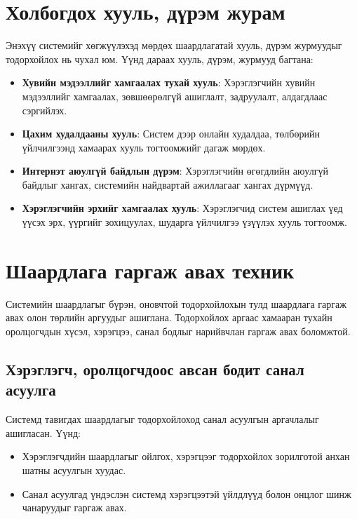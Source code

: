 
\section{Холбогдох хууль, дүрэм журам}
Энэхүү системийг хөгжүүлэхэд мөрдөх шаардлагатай хууль, дүрэм журмуудыг тодорхойлох нь чухал юм. Үүнд дараах хууль, дүрэм, журмууд багтана:
\begin{itemize}
    \item \textbf{Хувийн мэдээллийг хамгаалах тухай хууль}: Хэрэглэгчийн хувийн мэдээллийг хамгаалах, зөвшөөрөлгүй ашиглалт, задруулалт, алдагдлаас сэргийлэх.
    \item \textbf{Цахим худалдааны хууль}: Систем дээр онлайн худалдаа, төлбөрийн үйлчилгээнд хамаарах хууль тогтоомжийг дагаж мөрдөх.
    \item \textbf{Интернэт аюулгүй байдлын дүрэм}: Хэрэглэгчийн өгөгдлийн аюулгүй байдлыг хангах, системийн найдвартай ажиллагааг хангах дүрмүүд.
    \item \textbf{Хэрэглэгчийн эрхийг хамгаалах хууль}: Хэрэглэгчид систем ашиглах үед үүсэх эрх, үүргийг зохицуулах, шударга үйлчилгээ үзүүлэх хууль тогтоомж.
\end{itemize}

\section{Шаардлага гаргаж авах техник}
Системийн шаардлагыг бүрэн, оновчтой тодорхойлохын тулд шаардлага гаргаж авах олон төрлийн аргуудыг ашиглана. Тодорхойлох аргаас хамааран тухайн оролцогчдын хүсэл, хэрэгцээ, санал бодлыг нарийвчлан гаргаж авах боломжтой.

\subsection{Хэрэглэгч, оролцогчдоос авсан бодит санал асуулга}
Системд тавигдах шаардлагыг тодорхойлоход санал асуулгын аргачлалыг ашигласан. Үүнд:
\begin{itemize}
    \item Хэрэглэгчдийн шаардлагыг ойлгох, хэрэгцээг тодорхойлох зорилготой анхан шатны асуулгын хуудас.
    \item Санал асуулгад үндэслэн системд хэрэгцээтэй үйлдлүүд болон онцлог шинж чанаруудыг гаргаж авах.
\end{itemize}

